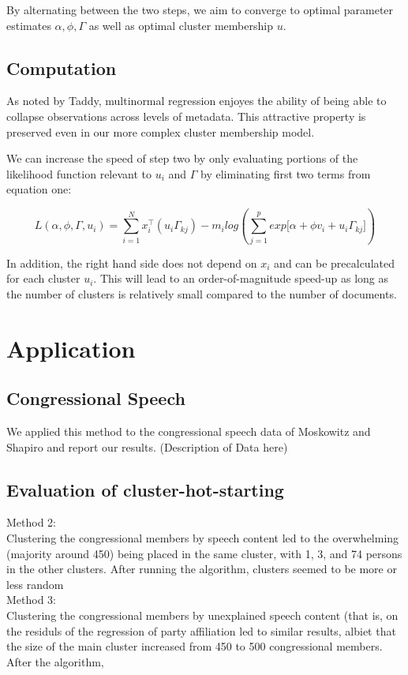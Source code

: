\documentclass[12pt]{article}
\begin{document}
By alternating between the two steps, we aim to converge to optimal
parameter estimates $\alpha, \phi, \Gamma$ as well as optimal cluster
membership $u$.
\subsection{Computation}\label{computation}
As noted by Taddy, multinormal regression enjoyes the ability of being able to
collapse observations across levels of metadata. This attractive
property is preserved even in our more complex cluster membership model.

We can increase the speed of step two by only evaluating portions of the likelihood function relevant to $u_i$ and $\Gamma$ by eliminating first two terms from equation one:

\begin{equation} 
L(\alpha,\phi,\Gamma,u_i) = \sum_{i = 1}^{N}{ x_i^\top (u_i \Gamma_{kj})} - m_i log(\sum_{j = 1}^{p}{exp{\big[ \alpha + \phi v_i + u_i \Gamma_{kj} \big]}})
\end{equation}

In addition, the right hand side does not depend on $x_i$ and can be precalculated for each cluster $u_i$. This will lead to an order-of-magnitude speed-up as long as the number of clusters is relatively small compared to the number of documents. 



\section{Application}\label{application}

\subsection{Congressional Speech} 

We applied this method to the congressional speech data of Moskowitz and Shapiro and report our results. (Description of Data here)
\subsection{Evaluation of cluster-hot-starting} 
Method 2: \\
Clustering the congressional members by speech content led to the overwhelming (majority around 450) being placed in the same cluster, with 1, 3, and 74 persons in the other clusters. After running the algorithm, clusters seemed to be more or less random
\\
Method 3:\\
Clustering the congressional members by unexplained speech content (that is, on the residuls of the regression of party affiliation led to similar results, albiet that the size of the main cluster increased from 450 to 500 congressional members. 
After the algorithm, 
\end{document}
